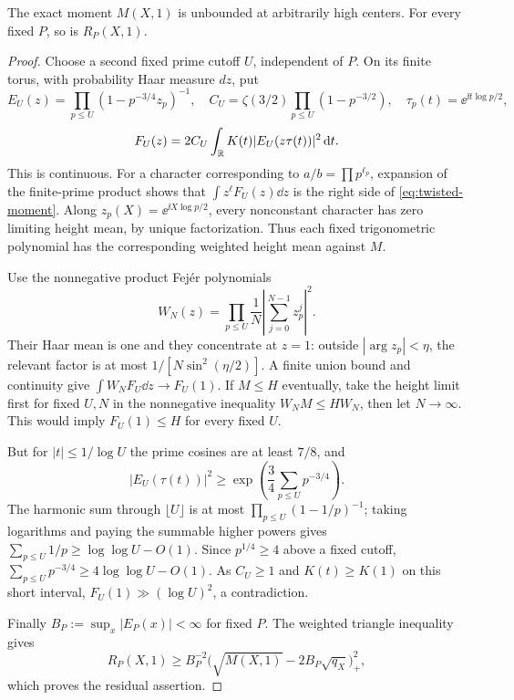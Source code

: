 \begin{theorem}
\label{thm:fixed-residual-unbounded}
The exact moment \(M(X,1)\) is unbounded at arbitrarily high centers.
For every fixed \(P\), so is \(R_P(X,1)\).
\end{theorem}
\begin{proof}
Choose a second fixed prime cutoff \(U\), independent of \(P\).
On its finite torus, with probability Haar measure \(dz\), put
\[
 E_U(z)=\prod_{p\le U}(1-p^{-3/4}z_p)^{-1},\quad
 C_U=\zeta(3/2)\prod_{p\le U}(1-p^{-3/2}),\quad
 \tau_p(t)=\ee^{\ii t\log p/2},
\]
\[
 F_U(z)=2C_U\int_\mathbb R K(t)|E_U(z\tau(t))|^2\,\mathrm d t.
\]
This is continuous. For a character corresponding to
\(a/b=\prod p^{\ell_p}\), expansion of the finite-prime product
shows that \(\int z^\ell F_U(z)\dd z\) is the right side of
\eqref{eq:twisted-moment}. Along \(z_p(X)=\ee^{\ii X\log p/2}\),
every nonconstant character has zero limiting height mean, by unique
factorization. Thus each fixed trigonometric polynomial has the
corresponding weighted height mean against \(M\).

Use the nonnegative product Fej\'er polynomials
\[
 W_N(z)=\prod_{p\le U}\frac1N\left|\sum_{j=0}^{N-1}z_p^j\right|^2.
\]
Their Haar mean is one and they concentrate at \(z=1\): outside
\(|\arg z_p|<\eta\), the relevant factor is at most
\(1/[N\sin^2(\eta/2)]\). A finite union bound and continuity give
\(\int W_NF_U\dd z\to F_U(1)\).
If \(M\le H\) eventually, take the height limit first for fixed
\(U,N\) in the nonnegative inequality \(W_NM\le HW_N\), then
let \(N\to\infty\). This would imply \(F_U(1)\le H\) for every
fixed \(U\).

But for \(|t|\le1/\log U\) the prime cosines are at least \(7/8\),
and
\[
 |E_U(\tau(t))|^2\ge
        \exp\left(\frac34\sum_{p\le U}p^{-3/4}\right).
\]
The harmonic sum through \(\lfloor U\rfloor\) is at most
\(\prod_{p\le U}(1-1/p)^{-1}\); taking logarithms and paying the
summable higher powers gives
\(\sum_{p\le U}1/p\ge\log\log U-O(1)\).
Since \(p^{1/4}\ge4\) above a fixed cutoff,
\(\sum_{p\le U}p^{-3/4}\ge4\log\log U-O(1)\).
As \(C_U\ge1\) and \(K(t)\ge K(1)\) on this short interval,
\(F_U(1)\gg(\log U)^2\), a contradiction.

Finally \(B_P:=\sup_x|E_P(x)|<\infty\) for fixed \(P\). The
weighted triangle inequality gives
\begin{equation}\label{eq:residual-unbounded-transfer}
 R_P(X,1)\ge B_P^{-2}
        \bigl(\sqrt{M(X,1)}-2B_P\sqrt{q_X}\bigr)_+^2,
\end{equation}
which proves the residual assertion.
\end{proof}

